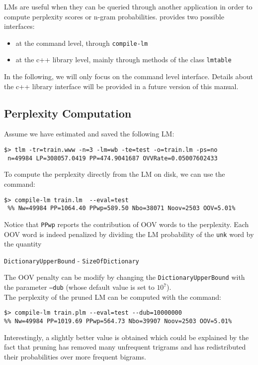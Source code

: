 LMs are useful when they can be queried through another application in order to compute 
perplexity scores or n-gram probabilities. {\IRSTLM} provides two possible interfaces: 
\begin{itemize}
\item at the command level, through  {\tt compile-lm}
\item at the c++ library level, mainly through methods of the class {\tt lmtable}
\end{itemize}

\noindent
In the following, we will only focus on the command level interface. Details about
the c++ library interface will be provided in a future version of this manual.  

\subsection{Perplexity Computation}
Assume we have estimated and saved the following LM:

\begin{verbatim}
$> tlm -tr=train.www -n=3 -lm=wb -te=test -o=train.lm -ps=no
 n=49984 LP=308057.0419 PP=474.9041687 OVVRate=0.05007602433
\end{verbatim}

\noindent
To compute the perplexity directly from the LM on disk, we can use the command:

\begin{verbatim}
$> compile-lm train.lm  --eval=test
 %% Nw=49984 PP=1064.40 PPwp=589.50 Nbo=38071 Noov=2503 OOV=5.01%
\end{verbatim}
Notice that {\tt PPwp} reports the contribution of OOV words to the perplexity. Each OOV word is indeed penalized by dividing the
LM probability of the {\tt unk} word by  the quantity


\centerline{{\tt DictionaryUpperBound} - {\tt SizeOfDictionary}}

\noindent
The OOV penalty can be modify by changing the {\tt DictionaryUpperBound} with the parameter {\tt --dub} (whose default value is set to $10^7$). \\

\noindent
The perplexity of the pruned LM can be computed with the command:
\begin{verbatim}
$> compile-lm train.plm --eval=test --dub=10000000
%% Nw=49984 PP=1019.69 PPwp=564.73 Nbo=39907 Noov=2503 OOV=5.01%
\end{verbatim}
Interestingly, a slightly better value is obtained which could be explained by the 
fact that pruning has removed many unfrequent trigrams and has redistributed 
their probabilities over more frequent bigrams.

